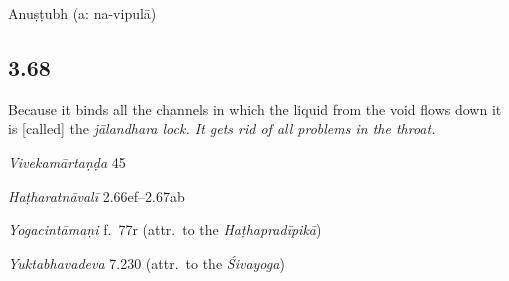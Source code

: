 \begin{ekdosis}
\begin{metre}[hp03_067]
Anuṣṭubh (a: na-vipulā)
\end{metre}

\subsection*{3.68}
\begin{translation}[hp03_068]
Because it binds all the channels in which the liquid from the void flows down it is [called] the \sl{jālandhara} lock. It gets rid of all problems in the throat.%
\end{translation}

\begin{sources}[hp03_068]
\emph{Vivekamārtaṇḍa} 45
\begin{versinnote}
\end{versinnote}
\end{sources}

\begin{testimonia}[hp03_068]
\emph{Haṭharatnāvalī} 2.66ef–2.67ab
\begin{versinnote}
\end{versinnote}

\emph{Yogacintāmaṇi} f.~77r (attr.~to the \emph{Haṭhapradīpikā})
\begin{versinnote}
\end{versinnote}

\emph{Yuktabhavadeva} 7.230 (attr.~to the \emph{Śivayoga})
\begin{versinnote}
\end{versinnote}

\end{testimonia}


\end{ekdosis}

